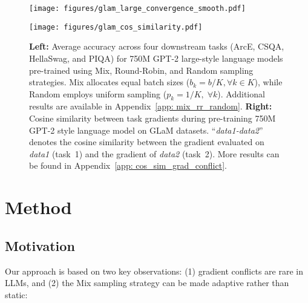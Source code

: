%
%
%
%
%
%
%
%
%
%
%
%
\begin{figure}[!tb]
\vskip 0.2in
\begin{minipage}{.5\textwidth}
     \centering
    \texttt{[image: figures/glam\_large\_convergence\_smooth.pdf]}
\end{minipage}%
\begin{minipage}{.5\textwidth}
  \centering
  \texttt{[image: figures/glam\_cos\_similarity.pdf]}
\end{minipage}
\caption{\footnotesize \textbf{Left: }Average accuracy across four downstream tasks (ArcE, CSQA, HellaSwag, and PIQA) for 750M GPT-2 large-style language models pre-trained using Mix, Round-Robin, and Random sampling strategies. Mix allocates equal batch sizes ($b_k = b/K, \forall k \in K$), while Random employs uniform sampling ($p_k= 1/K, \;\forall k$). Additional results are available in Appendix~\ref{app: mix_rr_random}. \textbf{Right: }  Cosine similarity between task gradients during pre-training 750M GPT-2 style language model on GLaM datasets. ``\textit{data1-data2}'' denotes the cosine similarity between the gradient evaluated on \textit{data1} (task~1) and the gradient of \textit{data2} (task~2). More results can be found in Appendix~\ref{app: cos_sim_grad_conflict}.}
\label{fig: motivation_why_mix}
\end{figure}

\normalsize

\section{Method}\label{sec:method}  
\subsection{Motivation}\label{sec:motivation}  

Our approach is based on two key observations: (1) gradient conflicts are rare in LLMs, and (2) the Mix sampling strategy can be made adaptive rather than static:  

